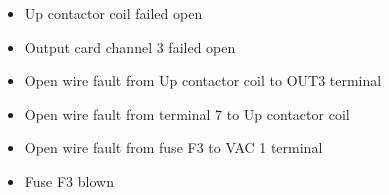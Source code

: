 \begin{itemize}
\item{} Up contactor coil failed open
\item{} Output card channel 3 failed open
\item{} Open wire fault from Up contactor coil to OUT3 terminal
\item{} Open wire fault from terminal 7 to Up contactor coil
\item{} Open wire fault from fuse F3 to VAC 1 terminal
\item{} Fuse F3 blown
\end{itemize}











